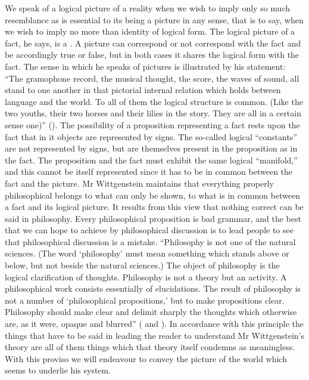 We speak of a logical picture of a reality when we
wish to imply only so much resemblance as is essential to
its being a picture in any sense, that is to say, when we
wish to imply no more than identity of logical form.
The logical picture of a fact, he says, is a . A
picture can correspond or not correspond with the fact and
be accordingly true or false, but in both cases it shares the
logical form with the fact. The sense in which he speaks of
pictures is illustrated by his statement: ``The gramophone
record, the musical thought, the score, the waves of sound,
all stand to one another in that pictorial internal relation
which holds between language and the world. To all of
them the logical structure is common. (Like the two
youths, their two horses and their lilies in the story.
They are all in a certain sense one)'' (). The
possibility of a proposition representing a fact rests upon
the fact that in it objects are represented by signs. The
so-called logical ``constants'' are not represented by signs,
but are themselves present in the proposition as in the
fact. The proposition and the fact must exhibit the same
logical ``manifold,'' and this cannot be itself represented
since it has to be in common between the fact and
the picture. Mr Wittgenstein maintains that everything
properly philosophical belongs to what can only be shown,
to what is in common between a fact and its logical
picture. It results from this view that nothing correct can
be said in philosophy. Every philosophical proposition
is bad grammar, and the best that we can hope to achieve
by philosophical discussion is to lead people to see that
philosophical discussion is a mistake. ``Philosophy is
not one of the natural sciences. (The word `philosophy'
must mean something which stands above or below, but
not beside the natural sciences.) The object of philosophy
is the logical clarification of thoughts. Philosophy is not
a theory but an activity. A philosophical work consists
essentially of elucidations. The result of philosophy is
not a number of `philosophical propositions,' but to
make propositions clear. Philosophy should make clear
and delimit sharply the thoughts which otherwise are,
as it were, opaque and blurred'' ( and ). In
accordance with this principle the things that have to be
said in leading the reader to understand Mr Wittgenstein's
theory are all of them things which that theory itself
condemns as meaningless. With this proviso we will
endeavour to convey the picture of the world which
seems to underlie his system.

